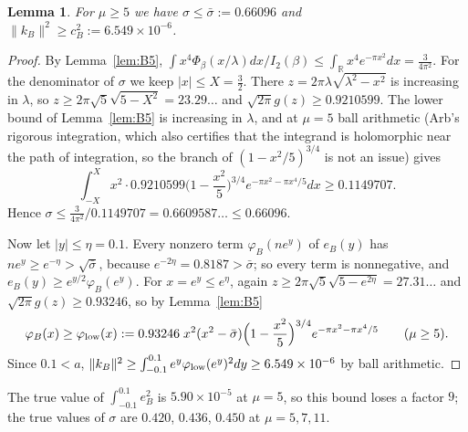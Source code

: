 \documentclass[11pt]{amsart}
\newtheorem{lemma}[proposition]{Lemma}
\theoremstyle{definition}
\theoremstyle{remark}
\numberwithin{equation}{section}
\newcommand{\R}{\mathbb{R}}
\begin{document}
\begin{lemma}\label{lem:B6}
For $\mu\ge5$ we have $\sigma\le\bar\sigma:=0.66096$ and $\|k_B\|^2\ge c_B^2:=6.549\times10^{-6}$.
\end{lemma}
\begin{proof}
By Lemma~\ref{lem:B5}, $\int x^4\Phi_\beta(x/\lambda)dx/I_2(\beta)\le\int_\R x^4e^{-\pi x^2}dx=\frac3{4\pi^2}$. For the denominator of $\sigma$ we keep $|x|\le X=\frac32$. There $z=2\pi\lambda\sqrt{\lambda^2-x^2}$ is increasing in $\lambda$, so $z\ge2\pi\sqrt5\sqrt{5-X^2}=23.29\ldots$ and $\sqrt{2\pi}g(z)\ge0.9210599$. The lower bound of Lemma~\ref{lem:B5} is increasing in $\lambda$, and at $\mu=5$ ball arithmetic (Arb's rigorous integration, which also certifies that the integrand is holomorphic near the path of integration, so the branch of $(1-x^2/5)^{3/4}$ is not an issue) gives
\[
\int_{-X}^{X}x^2\cdot0.9210599\Big(1-\frac{x^2}5\Big)^{3/4}e^{-\pi x^2-\pi x^4/5}dx\ge0.1149707 .
\]
Hence $\sigma\le\frac3{4\pi^2}/0.1149707=0.6609587\ldots\le0.66096$.

Now let $|y|\le\eta=0.1$. Every nonzero term $\varphi_B(ne^y)$ of $e_B(y)$ has $ne^y\ge e^{-\eta}>\sqrt{\bar\sigma}$, because $e^{-2\eta}=0.8187>\bar\sigma$; so every term is nonnegative, and $e_B(y)\ge e^{y/2}\varphi_B(e^y)$. For $x=e^y\le e^{\eta}$, again $z\ge2\pi\sqrt5\sqrt{5-e^{2\eta}}=27.31\ldots$ and $\sqrt{2\pi}g(z)\ge0.93246$, so by Lemma~\ref{lem:B5}
\[
\varphi_B(x)\ge\varphi_{\rm low}(x):=0.93246\;x^2(x^2-\bar\sigma)\Big(1-\frac{x^2}5\Big)^{3/4}e^{-\pi x^2-\pi x^4/5}\qquad(\mu\ge5).
\]
Since $0.1<a$, $\|k_B\|^2\ge\int_{-0.1}^{0.1}e^{y}\varphi_{\rm low}(e^y)^2dy\ge6.549\times10^{-6}$ by ball arithmetic.
\end{proof}
The true value of $\int_{-0.1}^{0.1}e_B^2$ is $5.90\times10^{-5}$ at $\mu=5$, so this bound loses a factor $9$; the true values of $\sigma$ are $0.420$, $0.436$, $0.450$ at $\mu=5,7,11$.
\end{document}
